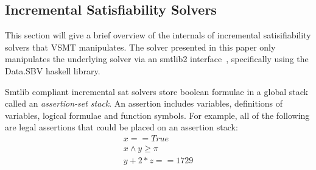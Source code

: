 \subsection{Incremental Satisfiability Solvers}
\label{bk-sat}
This section will give a brief overview of the internals of incremental
satisifiability solvers that VSMT manipulates. The solver presented in this
paper only manipulates the underlying solver via an smtlib2
interface~\cite{BarFT-SMTLIB}, specifically using the 
Data.SBV haskell library.

Smtlib compliant incremental sat solvers store boolean formulae in a global
stack called an \textit{assertion-set stack}. An assertion includes variables,
definitions of variables, logical formulae and function symbols. For example,
all of the following are legal assertions that could be placed on an assertion
stack:
\begin{align*}
  x == True \\
  x \wedge y \geq \pi \\
  y + 2 * z == 1729
\end{align*}
